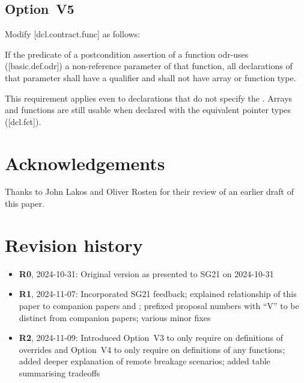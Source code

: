 \subsection*{Option~V5}

Modify [dcl.contract.func] as follows:

\begin{adjustwidth}{0.5cm}{0.5cm}
If the predicate of a postcondition assertion of a function odr-uses ([basic.def.odr]) a
non-reference parameter of that function, all declarations of that parameter shall have a  qualifier and
shall not have array or function type.
\begin{note}
This requirement applies even to declarations
that do not specify the . Arrays and functions are still usable when declared with the equivalent pointer types ([dcl.fct]).
\end{note}
\begin{example}
\tcode{[...]}
\end{example}

\end{adjustwidth}


\section*{Acknowledgements}

Thanks to John Lakos and Oliver Rosten for their review of an earlier draft of this paper.


\section*{Revision history}

\begin{itemize}
\item \textbf{R0}, 2024-10-31: Original version as presented to SG21 on 2024-10-31
\item \textbf{R1}, 2024-11-07: Incorporated SG21 feedback; explained relationship of this paper to companion papers \cite{P3487R0} and \cite{P3489R0}; prefixed proposal numbers with ``V'' to be distinct from companion papers; various minor fixes
\item \textbf{R2}, 2024-11-09: Introduced Option~V3 to only require  on definitions of overrides and Option~V4 to only require  on definitions of any functions; added deeper explanation of remote breakage scenarios; added table summarising tradeoffs
\end{itemize}

